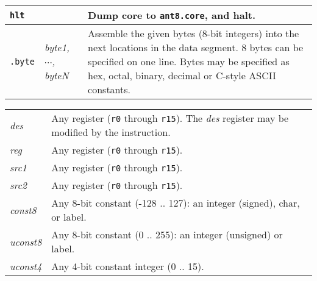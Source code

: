 \documentclass[10pt]{report}
\begin{document}
\begin{tabular}{|ll|p{4.5in}|}
\hline
        {\tt hlt}   &			&
		Dump core to {\tt ant8.core}, and halt.
		\\
\hline\hline
	{\tt .byte} & {\em byte1, $\cdots$, byteN }   &
		Assemble the given bytes (8-bit integers) into the
		next locations in the data segment.  
		8 bytes can be specified on one line.  Bytes
		may be specified as hex, octal, binary, decimal
		or C-style {\sc ASCII} constants.
                \\
\hline 
\end{tabular}

\begin{center}
\begin{tabular}{|lp{5.5in}|}
\hline
{\em des}       & Any register ({\tt r0} through {\tt r15}). The {\em des} register
			may be modified by the instruction. \\
{\em reg}       & Any register ({\tt r0} through {\tt r15}). \\
{\em src1}      & Any register ({\tt r0} through {\tt r15}). \\
{\em src2}      & Any register ({\tt r0} through {\tt r15}). \\
{\em const8}     & Any 8-bit constant (-128 .. 127):
			an integer (signed), char, or label. \\
{\em uconst8}	& Any 8-bit constant (0 .. 255):
			an integer (unsigned) or label. \\
{\em uconst4}	& Any 4-bit constant integer (0 .. 15). \\
\hline
\end{tabular}
\end{center}
\end{document}
